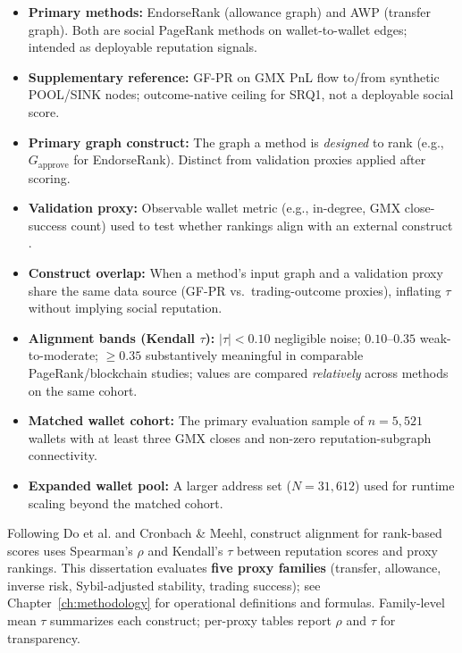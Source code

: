 \begin{itemize}
\item \textbf{Primary methods:} EndorseRank (allowance graph) and AWP (transfer graph). Both are social PageRank methods on wallet-to-wallet edges; intended as deployable reputation signals.
\item \textbf{Supplementary reference:} GF-PR on GMX PnL flow to/from synthetic POOL/SINK nodes; outcome-native ceiling for SRQ1, not a deployable social score.
\item \textbf{Primary graph construct:} The graph a method is \emph{designed} to rank (e.g., $G_{\text{approve}}$ for EndorseRank). Distinct from validation proxies applied after scoring.
\item \textbf{Validation proxy:} Observable wallet metric (e.g., in-degree, GMX close-success count) used to test whether rankings align with an external construct .
\item \textbf{Construct overlap:} When a method's input graph and a validation proxy share the same data source (GF-PR vs.\ trading-outcome proxies), inflating $\tau$ without implying social reputation.
\item \textbf{Alignment bands (Kendall $\tau$):} $|\tau|<0.10$ negligible noise; $0.10$--$0.35$ weak-to-moderate; $\geq 0.35$ substantively meaningful in comparable PageRank/blockchain studies; values are compared \emph{relatively} across methods on the same cohort.
\item \textbf{Matched wallet cohort:} The primary evaluation sample of $n=5{,}521$ wallets with at least three GMX closes and non-zero reputation-subgraph connectivity.
\item \textbf{Expanded wallet pool:} A larger address set ($N=31{,}612$) used for runtime scaling beyond the matched cohort.
\end{itemize}


Following Do et al. and Cronbach \& Meehl, construct alignment for rank-based scores uses Spearman's $\rho$ and Kendall's $\tau$ between reputation scores and proxy rankings. This dissertation evaluates \textbf{five proxy families} (transfer, allowance, inverse risk, Sybil-adjusted stability, trading success); see Chapter~\ref{ch:methodology} for operational definitions and formulas. Family-level mean $\tau$ summarizes each construct; per-proxy tables report $\rho$ and $\tau$ for transparency.

